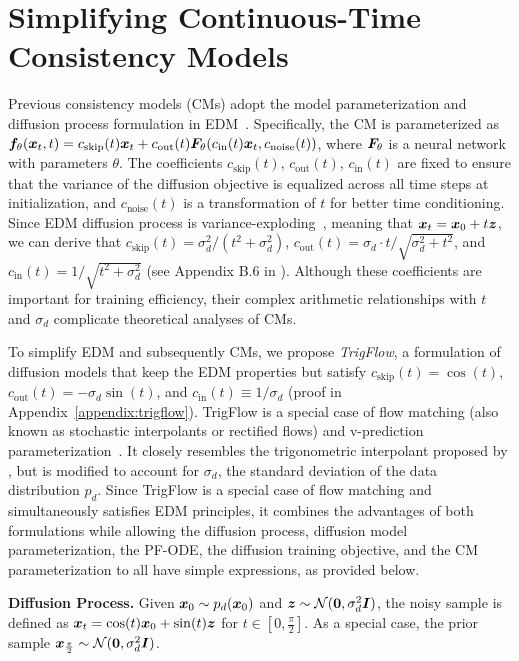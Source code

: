 \section{Simplifying Continuous-Time Consistency Models}
\label{sec:trigflow}

Previous consistency models (CMs) adopt the model parameterization and diffusion process formulation in EDM~\citep{karras2022edm}. Specifically, the CM is parameterized as ${\bm{f}}_\theta({\bm{x}}_t,t) = c_{\text{skip}}(t){\bm{x}}_t + c_{\text{out}}(t){\bm{F}}_\theta(c_{\text{in}}(t){\bm{x}}_t, c_{\text{noise}}(t))$, where ${\bm{F}}_\theta$ is a neural network with parameters $\theta$. The coefficients $c_{\text{skip}}(t)$, $c_{\text{out}}(t)$, $c_{\text{in}}(t)$ are fixed to ensure that the variance of the diffusion objective is equalized across all time steps at initialization, and $c_\text{noise}(t)$ is a transformation of $t$ for better time conditioning. Since EDM diffusion process is variance-exploding~\citep{song2020score}, meaning that ${\bm{x}}_t = {\bm{x}}_0 + t {\bm{z}}$, we can derive that $c_{\text{skip}}(t) = \sigma_d^2 / (t^2 + \sigma_d^2)$, $c_{\text{out}}(t) = \sigma_d \cdot t / \sqrt{\sigma_d^2 + t^2}$, and $c_{\text{in}}(t) = 1 / \sqrt{t^2 + \sigma_d^2}$ (see Appendix B.6 in \citet{karras2022edm}). Although these coefficients are important for training efficiency, their complex arithmetic relationships with $t$ and $\sigma_d$ complicate theoretical analyses of CMs.


To simplify EDM and subsequently CMs, we propose \emph{TrigFlow}, a formulation of diffusion models that keep the EDM properties but satisfy $c_\text{skip}(t) =\cos(t)$, $c_\text{out}(t) =-\sigma_d\sin(t)$, and $c_\text{in}(t) \equiv 1/\sigma_d$ (proof in Appendix~\ref{appendix:trigflow}). TrigFlow is a special case of flow matching (also known as stochastic interpolants or rectified flows) and v-prediction parameterization~\citep{salimans2022progressive}. It closely resembles the trigonometric interpolant proposed by \citet{albergo2023building,albergo2023stochastic_interpolants,ma2024sit}, but is modified to account for $\sigma_d$, the standard deviation of the data distribution $p_d$. Since TrigFlow is a special case of flow matching and simultaneously satisfies EDM principles, it combines the advantages of both formulations while allowing the diffusion process, diffusion model parameterization, the PF-ODE, the diffusion training objective, and the CM parameterization to all have simple expressions, as provided below.

\textbf{Diffusion Process. }
Given ${\bm{x}}_0\sim p_d({\bm{x}}_0)$ and ${\bm{z}} \sim {\mathcal{N}}({\bm{0}}, \sigma_d^2 {\bm{I}})$, the noisy sample is defined as ${\bm{x}}_t = \cos(t){\bm{x}}_0 + \sin(t){\bm{z}}$ for $t \in [0,\frac{\pi}{2}]$. As a special case, the prior sample ${\bm{x}}_\frac{\pi}{2} \sim {\mathcal{N}}({\bm{0}}, \sigma_d^2 {\bm{I}})$.

